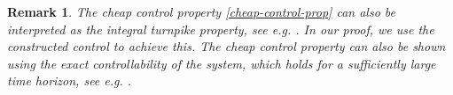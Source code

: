 \documentclass[12pt]{article}
\newtheorem{remark}{Remark}[section]
\numberwithin{equation}{section}
\begin{document}

\begin{remark}
The cheap control property \eqref{cheap-control-prop} can also be interpreted as the integral turnpike property, see e.g. \cite{gugat2019turnpike}. In our proof, we use the constructed control to achieve this. The cheap control property can also be shown using the exact controllability of the system, which holds for a sufficiently large time horizon, see e.g. \cite{MR2655971}. 
\end{remark}
\end{document}
